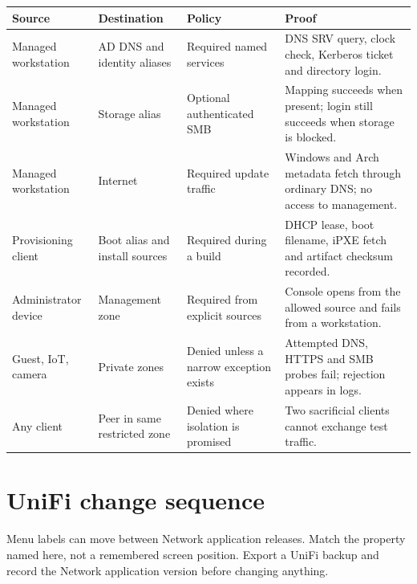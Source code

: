\begin{tabularx}{\linewidth}{@{}p{.19\linewidth}p{.22\linewidth}p{.20\linewidth}L@{}}
\toprule
\textbf{Source} & \textbf{Destination} & \textbf{Policy} & \textbf{Proof}\\
\midrule
Managed workstation & AD DNS and identity aliases & Required named services & DNS SRV query, clock check, Kerberos ticket and directory login.\\
Managed workstation & Storage alias & Optional authenticated SMB & Mapping succeeds when present; login still succeeds when storage is blocked.\\
Managed workstation & Internet & Required update traffic & Windows and Arch metadata fetch through ordinary DNS; no access to management.\\
Provisioning client & Boot alias and install sources & Required during a build & DHCP lease, boot filename, iPXE fetch and artifact checksum recorded.\\
Administrator device & Management zone & Required from explicit sources & Console opens from the allowed source and fails from a workstation.\\
Guest, IoT, camera & Private zones & Denied unless a narrow exception exists & Attempted DNS, HTTPS and SMB probes fail; rejection appears in logs.\\
Any client & Peer in same restricted zone & Denied where isolation is promised & Two sacrificial clients cannot exchange test traffic.\\
\bottomrule
\end{tabularx}

\section{UniFi change sequence}
Menu labels can move between Network application releases.  Match the property
named here, not a remembered screen position.  Export a UniFi backup and record
the Network application version before changing anything.


